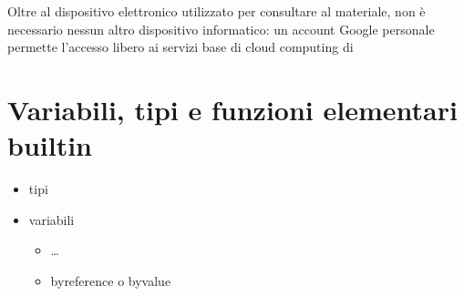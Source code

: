 \documentclass[letterpaper,10pt,english]{jupyterBook}
\begin{document}
\sphinxAtStartPar
Oltre al dispositivo elettronico utilizzato per consultare al materiale, non è necessario nessun altro dispositivo informatico: un account Google personale permette l’accesso libero ai servizi base di cloud computing di 

\sphinxstepscope


\chapter{Variabili, tipi e funzioni elementari built\sphinxhyphen{}in}
\label{\detokenize{ch/programming/types:variabili-tipi-e-funzioni-elementari-built-in}}\label{\detokenize{ch/programming/types::doc}}\begin{itemize}
\item {} 
\sphinxAtStartPar
tipi

\item {} 
\sphinxAtStartPar
variabili
\begin{itemize}
\item {} 
\sphinxAtStartPar
…

\item {} 
\sphinxAtStartPar
by\sphinxhyphen{}reference o by\sphinxhyphen{}value

\end{itemize}

\end{itemize}
\end{document}
